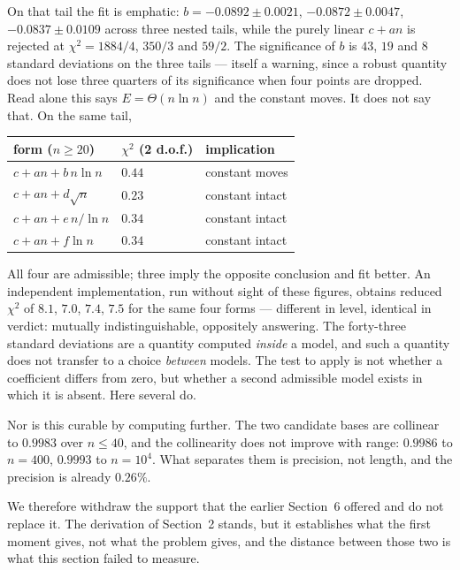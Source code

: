 \documentclass[11pt,a4paper]{article}
\begin{document}
On that tail the fit is emphatic: $b=-0.0892\pm0.0021$, $-0.0872\pm0.0047$, $-0.0837\pm0.0109$
across three nested tails, while the purely linear $c+an$ is rejected at $\chi^2=1884/4$, $350/3$
and $59/2$.  The significance of $b$ is $43$, $19$ and $8$ standard deviations on the
three tails --- itself a warning, since a robust quantity does not lose three quarters of its
significance when four points are dropped.  Read alone this says $E=\Theta(n\ln n)$ and the constant
moves.  It does not say that.  On the same tail,
\begin{center}
\begin{tabular}{lll}
\toprule
form ($n\ge20$) & $\chi^2$ (2 d.o.f.) & implication\\
\midrule
$c+an+b\,n\ln n$ & $0.44$ & constant moves\\
$c+an+d\sqrt n$ & $0.23$ & constant intact\\
$c+an+e\,n/\ln n$ & $0.34$ & constant intact\\
$c+an+f\ln n$ & $0.34$ & constant intact\\
\bottomrule
\end{tabular}
\end{center}
All four are admissible; three imply the opposite conclusion and fit better.  An independent
implementation, run without sight of these figures, obtains reduced $\chi^2$ of $8.1$, $7.0$,
$7.4$, $7.5$ for the same four forms --- different in level, identical in verdict: mutually
indistinguishable, oppositely answering.  The forty-three
standard deviations are a quantity computed \emph{inside} a model, and such a quantity does not
transfer to a choice \emph{between} models.  The test to apply is not whether a coefficient
differs from zero, but whether a second admissible model exists in which it is absent.  Here
several do.

Nor is this curable by computing further.  The two candidate bases are collinear to $0.9983$ over
$n\le40$, and the collinearity does not improve with range: $0.9986$ to $n=400$, $0.9993$ to
$n=10^4$.  What separates them is precision, not length, and the precision is already $0.26\%$.

We therefore withdraw the support that the earlier Section~6 offered and do not replace it.  The
derivation of Section~2 stands, but it establishes what the first moment gives, not what the
problem gives, and the distance between those two is what this section failed to measure.
\end{document}
